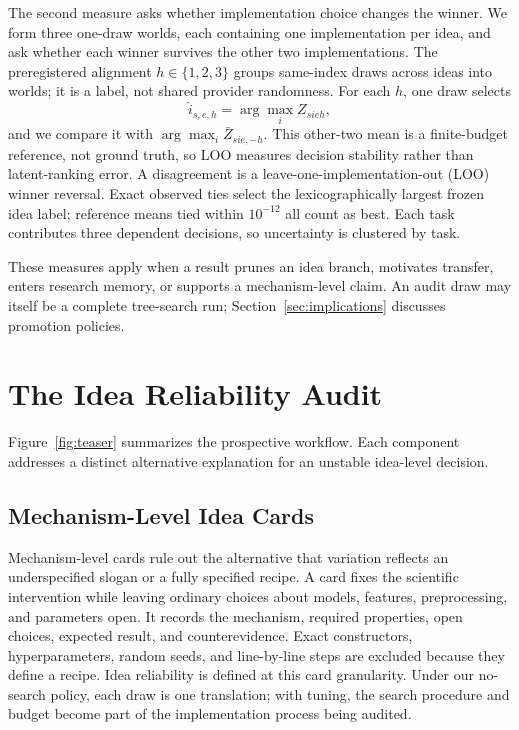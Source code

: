 \documentclass[letterpaper]{article}
\begin{document}
The second measure asks whether implementation choice changes the winner. We form three one-draw worlds, each containing one implementation per idea, and ask whether each winner survives the other two implementations. The preregistered alignment $h\in\{1,2,3\}$ groups same-index draws across ideas into worlds; it is a label, not shared provider randomness. For each $h$, one draw selects
\begin{equation}
\hat{i}_{s,e,h} = \arg\max_i Z_{sieh},
\end{equation}
and we compare it with $\arg\max_i \bar{Z}_{sie,-h}$. This other-two mean is a finite-budget reference, not ground truth, so LOO measures decision stability rather than latent-ranking error. A disagreement is a leave-one-implementation-out (LOO) winner reversal. Exact observed ties select the lexicographically largest frozen idea label; reference means tied within $10^{-12}$ all count as best. Each task contributes three dependent decisions, so uncertainty is clustered by task.

These measures apply when a result prunes an idea branch, motivates transfer, enters research memory, or supports a mechanism-level claim. An audit draw may itself be a complete tree-search run; Section~\ref{sec:implications} discusses promotion policies.

\section{The Idea Reliability Audit}

Figure~\ref{fig:teaser} summarizes the prospective workflow. Each component addresses a distinct alternative explanation for an unstable idea-level decision.

\subsection{Mechanism-Level Idea Cards}

Mechanism-level cards rule out the alternative that variation reflects an underspecified slogan or a fully specified recipe. A card fixes the scientific intervention while leaving ordinary choices about models, features, preprocessing, and parameters open. It records the mechanism, required properties, open choices, expected result, and counterevidence. Exact constructors, hyperparameters, random seeds, and line-by-line steps are excluded because they define a recipe. Idea reliability is defined at this card granularity. Under our no-search policy, each draw is one translation; with tuning, the search procedure and budget become part of the implementation process being audited.
\end{document}
